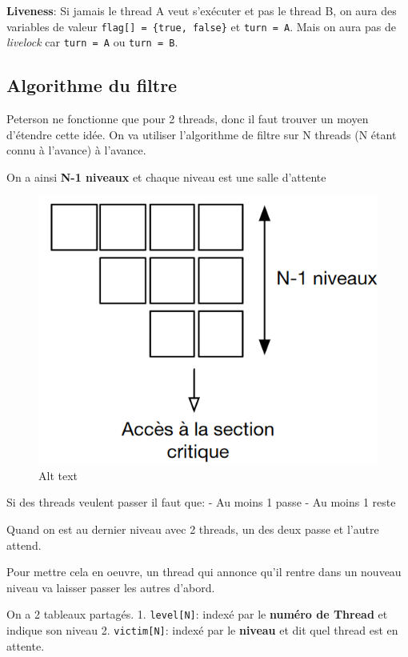 \textbf{Liveness}: Si jamais le thread A veut s'exécuter et pas le
thread B, on aura des variables de valeur
\texttt{flag{[}{]}\ =\ \{true,\ false\}} et \texttt{turn\ =\ A}. Mais on
aura pas de \emph{livelock} car \texttt{turn\ =\ A} ou
\texttt{turn\ =\ B}.

\subsection{Algorithme du filtre}\label{algorithme-du-filtre}

Peterson ne fonctionne que pour 2 threads, donc il faut trouver un moyen
d'étendre cette idée. On va utiliser l'algorithme de filtre sur N
threads (N étant connu à l'avance) à l'avance.

On a ainsi \textbf{N-1 niveaux} et chaque niveau est une salle d'attente

\begin{figure}
\centering
\includegraphics{image-25.png}
\caption{Alt text}
\end{figure}

Si des threads veulent passer il faut que: - Au moins 1 passe - Au moins
1 reste

Quand on est au dernier niveau avec 2 threads, un des deux passe et
l'autre attend.

Pour mettre cela en oeuvre, un thread qui annonce qu'il rentre dans un
nouveau niveau va laisser passer les autres d'abord.

On a 2 tableaux partagés. 1. \texttt{level{[}N{]}}: indexé par le
\textbf{numéro de Thread} et indique son niveau 2.
\texttt{victim{[}N{]}}: indexé par le \textbf{niveau} et dit quel thread
est en attente.

